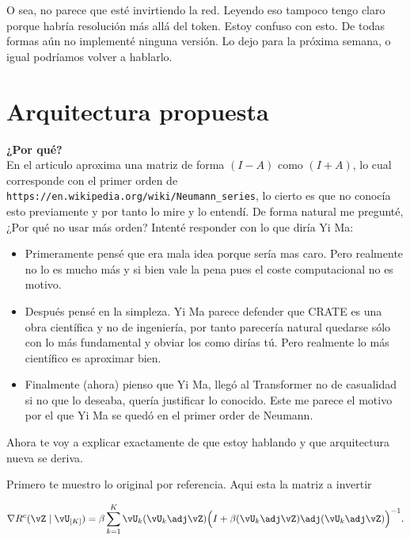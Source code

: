 \documentclass{article}
\begin{document}
\vspace{0.5in}

O sea, no parece que esté invirtiendo la red. Leyendo eso tampoco tengo claro porque habría resolución más allá del token. Estoy confuso con esto. De todas formas aún no implementé ninguna versión. Lo dejo para la próxima semana, o igual podríamos volver a hablarlo. \\

\section{Arquitectura propuesta}

\textbf{¿Por qué?} \\

En el articulo aproxima una matriz de forma $(I - A)$ como $(I + A)$, lo cual corresponde con el primer orden de \texttt{https://en.wikipedia.org/wiki/Neumann\_series}, lo cierto es que no conocía esto previamente y por tanto lo mire y lo entendí. De forma natural me pregunté, ¿Por qué no usar más orden? Intenté responder con lo que diría Yi Ma:

\begin{itemize}
	\item Primeramente pensé que era mala idea porque sería mas caro. Pero realmente no lo es mucho más y si bien vale la pena pues el coste computacional no es motivo.
	\item Después pensé en la simpleza. Yi Ma parece defender que CRATE es una obra científica y no de ingeniería, por tanto parecería natural quedarse sólo con lo más fundamental y obviar los  como dirías tú. Pero realmente lo más científico es aproximar bien.
	\item Finalmente (ahora) pienso que Yi Ma, llegó al Transformer no de casualidad si no que lo deseaba, quería justificar lo conocido. Este me parece el motivo por el que Yi Ma se quedó en el primer order de Neumann.
\end{itemize}

Ahora te voy a explicar exactamente de que estoy hablando y que arquitectura nueva se deriva.

\vspace{0.5in}
Primero te muestro lo original por referencia. Aqui esta la matriz a invertir

\begin{equation}
    \nabla R^c(\vZ \mid \vU_{[K]})
    = \beta\sum_{k=1}^K \vU_k(\vU_k\adj\vZ)\Big(I +
    \beta(\vU_k\adj\vZ)\adj(\vU_k\adj\vZ)\Big)^{-1}.
    \label{eq:rate-gradient}
\end{equation}
\end{document}
